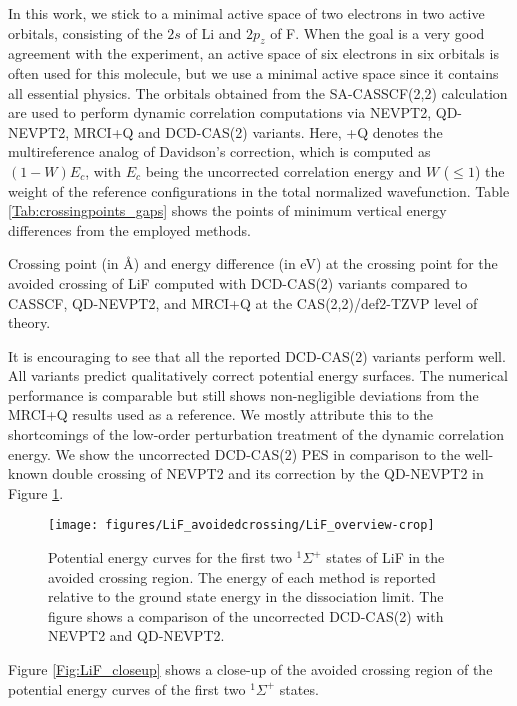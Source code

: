 In this work, we stick to a minimal active space of two electrons in two active orbitals, consisting of the $2s$ of Li and $2p_z$ of F. When the goal is a very good agreement with the experiment, an active space of six electrons in six orbitals is often used for this molecule, but we use a minimal active space since it contains all essential physics. The orbitals obtained from the SA-CASSCF(2,2) calculation are used to perform dynamic correlation computations via NEVPT2, QD-NEVPT2, MRCI+Q and DCD-CAS(2) variants. Here, +Q denotes the multireference analog of Davidson’s correction, which is computed as $(1 - W){E_c}$, with ${E_c}$ being the uncorrected correlation energy and $W$ ($\leq 1$) the weight of the reference configurations in the total normalized wavefunction. Table \ref{Tab:crossingpoints_gaps} shows the points of minimum vertical energy differences from the employed methods.
\begin{table}
\small
\centering
\ttabbox
{\caption[Crossing point and energy difference for the avoided crossing of LiF.]{Crossing point (in Å) and energy difference (in eV) at the crossing point for the avoided crossing of LiF computed with DCD-CAS(2) variants compared to CASSCF, QD-NEVPT2, and MRCI+Q at the CAS(2,2)/def2-TZVP level of theory.}
\label{Tab:crossingpoints_gaps}}
{}
\end{table}
It is encouraging to see that all the reported DCD-CAS(2) variants perform well. All variants predict qualitatively correct potential energy surfaces. The numerical performance is comparable but still shows non-negligible deviations from the MRCI+Q results used as a reference. We mostly attribute this to the shortcomings of the low-order perturbation treatment of the dynamic correlation energy. We show the uncorrected DCD-CAS(2) PES in comparison to the well-known double crossing of NEVPT2 and its correction by the QD-NEVPT2 in Figure \ref{Fig:LiF_overview}.
\begin{figure}
\texttt{[image: figures/LiF\_avoidedcrossing/LiF\_overview-crop]}
\caption[Potential energy curves for the first two $^1\Sigma^+$ states of LiF in the avoided crossing region.]{Potential energy curves for the first two $^1\Sigma^+$ states of LiF in the avoided crossing region. The energy of each method is reported relative to the ground state energy in the dissociation limit. The figure shows a comparison of the uncorrected DCD-CAS(2) with NEVPT2 and QD-NEVPT2.}
\label{Fig:LiF_overview}
\end{figure}
Figure \ref{Fig:LiF_closeup} shows a close-up of the avoided crossing region of the potential energy curves of the first two $^1\Sigma^+$ states.
